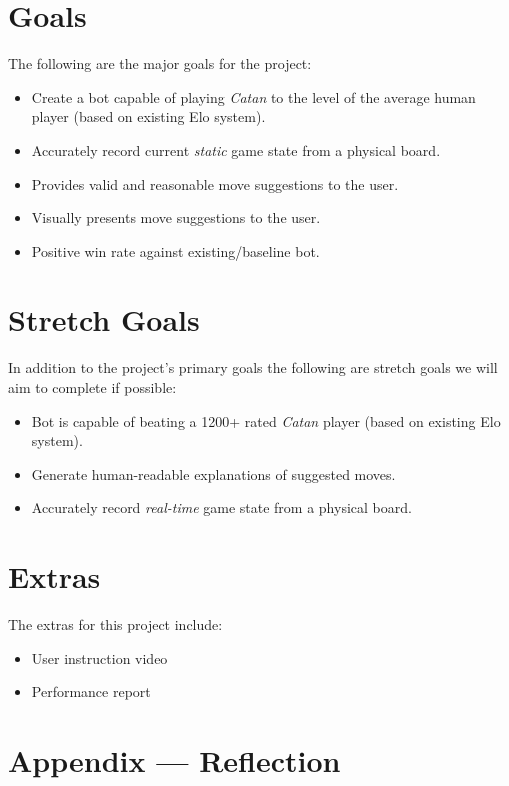 \documentclass{article}
\begin{document}
\section{Goals}\label{sec:goals}
The following are the major goals for the project:
\begin{itemize}
    \item Create a bot capable of playing \emph{Catan} to the level of the average human player (based on existing Elo system).
    \item Accurately record current \emph{static} game state from a physical board.
    \item Provides valid and reasonable move suggestions to the user.
    \item Visually presents move suggestions to the user.
    \item Positive win rate against existing/baseline bot.
\end{itemize}

\section{Stretch Goals}\label{sec:stretch-goals}
In addition to the project’s primary goals the following are stretch goals we will aim to complete if possible:
\begin{itemize}
    \item Bot is capable of beating a 1200+ rated \emph{Catan} player (based on existing Elo system).
    \item Generate human-readable explanations of suggested moves.
    \item Accurately record \emph{real-time} game state from a physical board.
\end{itemize}


\section{Extras}\label{sec:extras}


\raggedright

The extras for this project include:
\begin{itemize}
    \item User instruction video
    \item Performance report
\end{itemize}

\newpage{}

\section*{Appendix --- Reflection}
\end{document}
